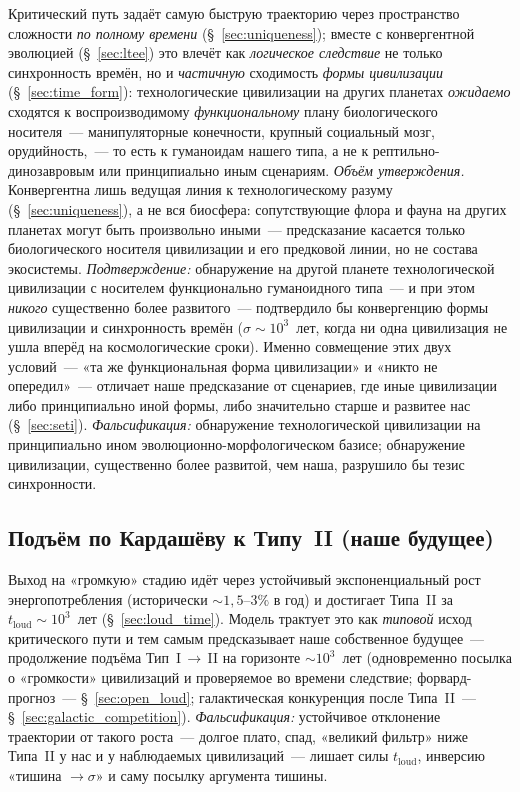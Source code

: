 \documentclass[12pt,a4paper]{article}
\begin{document}
Критический путь задаёт самую быструю траекторию через пространство сложности \emph{по полному времени} (\S~\ref{sec:uniqueness}); вместе с конвергентной эволюцией (\S~\ref{sec:ltee}) это влечёт как \emph{логическое следствие} не только синхронность времён, но и \emph{частичную} сходимость \emph{формы цивилизации} (\S~\ref{sec:time_form}): технологические цивилизации на других планетах \emph{ожидаемо} сходятся к воспроизводимому \emph{функциональному} плану биологического носителя~--- манипуляторные конечности, крупный социальный мозг, орудийность,~--- то есть к гуманоидам нашего типа, а не к рептильно-динозавровым или принципиально иным сценариям. \emph{Объём утверждения.} Конвергентна лишь ведущая линия к технологическому разуму (\S~\ref{sec:uniqueness}), а не вся биосфера: сопутствующие флора и фауна на других планетах могут быть произвольно иными~--- предсказание касается только биологического носителя цивилизации и его предковой линии, но не состава экосистемы. \emph{Подтверждение:} обнаружение на другой планете технологической цивилизации с носителем функционально гуманоидного типа~--- и при этом \emph{никого} существенно более развитого~--- подтвердило бы конвергенцию формы цивилизации и синхронность времён ($\sigma \sim 10^3$~лет, когда ни одна цивилизация не ушла вперёд на космологические сроки). Именно совмещение этих двух условий~--- «та же функциональная форма цивилизации» и «никто не опередил»~--- отличает наше предсказание от сценариев, где иные цивилизации либо принципиально иной формы, либо значительно старше и развитее нас (\S~\ref{sec:seti}). \emph{Фальсификация:} обнаружение технологической цивилизации на принципиально ином эволюционно-морфологическом базисе; обнаружение цивилизации, существенно более развитой, чем наша, разрушило бы тезис синхронности.

\subsection{Подъём по Кардашёву к Типу~II (наше будущее)}
\label{sec:pred_kardashev}

Выход на «громкую» стадию идёт через устойчивый экспоненциальный рост энергопотребления (исторически $\sim 1{,}5$--$3\%$ в год) и достигает Типа~II за $t_{\mathrm{loud}} \sim 10^3$~лет (\S~\ref{sec:loud_time}). Модель трактует это как \emph{типовой} исход критического пути и тем самым предсказывает наше собственное будущее~--- продолжение подъёма Тип~I\,$\to$\,II на горизонте $\sim 10^3$~лет (одновременно посылка о «громкости» цивилизаций и проверяемое во времени следствие; форвард-прогноз~--- \S~\ref{sec:open_loud}; галактическая конкуренция после Типа~II~--- \S~\ref{sec:galactic_competition}). \emph{Фальсификация:} устойчивое отклонение траектории от такого роста~--- долгое плато, спад, «великий фильтр» ниже Типа~II у нас и у наблюдаемых цивилизаций~--- лишает силы $t_{\mathrm{loud}}$, инверсию «тишина $\to \sigma$» и саму посылку аргумента тишины.
\end{document}
